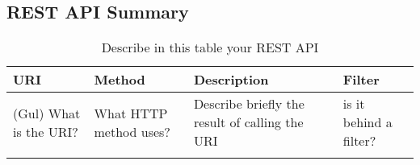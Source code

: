 \subsection{REST API Summary}


\begin{longtable}{|p{}|p{} |p{}|p{}|} 
\hline
\textbf{URI} & \textbf{Method} & \textbf{Description} & \textbf{Filter} \\\hline
(Gul)
What is the URI? & What HTTP method uses? &  Describe briefly the result of calling the URI & is it behind a filter?\\\hline
\caption{Describe in this table your REST API}
\label{tab:termGlossary}
\end{longtable}
